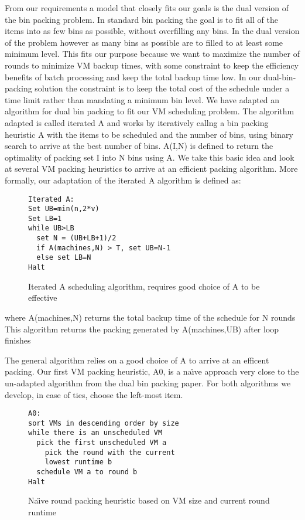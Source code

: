 From our requirements a model that closely fits our goals is the dual version
of the
bin packing problem. In standard bin packing the goal is to fit all of the
items into as few bins as possible, without overfilling any bins. In the dual
version of the problem however as many bins as possible are to filled to at
least some minimum level. This fits our purpose because we want to maximize the
number of rounds to minimize VM backup times, with some constraint to keep the
efficiency benefits of batch processing and keep the total backup time low.
In our dual-bin-packing solution the constraint is to keep the total
cost of the schedule under a time limit rather than mandating a minimum bin
level. We have adapted
an algorithm for dual bin packing\cite{DualBinPacking} to fit our VM
scheduling problem. The algorithm adapted is called iterated A and works by
iteratively callng a bin packing heuristic A with the items to be scheduled and
the number of bins, using binary search to arrive at the best number of
bins. A(I,N) is defined to return the optimality of packing set I into N bins
using A. We take this basic idea and look at several VM packing heuristics to
arrive at an efficient packing algorithm. More formally, our adaptation of the
iterated A algorithm is defined as:


\begin{figure}
\begin{lstlisting}[frame=single]
Iterated A:
Set UB=min(n,2*v)
Set LB=1
while UB>LB
  set N = (UB+LB+1)/2
  if A(machines,N) > T, set UB=N-1
  else set LB=N
Halt
\end{lstlisting}
\caption{Iterated A scheduling algorithm, requires good choice of A to be effective}
\end{figure}

where A(machines,N) returns the total backup time of the schedule for N rounds\\
This algorithm returns the packing generated by A(machines,UB) after loop finishes

The general algorithm relies on a good choice of A to arrive at an efficent
packing. Our first VM packing heuristic, A0, is a na\"\i{}ve approach very
close to the un-adapted algorithm from the dual bin packing paper. For both
algorithms we develop, in case of ties, choose the left-most item.

\begin{figure}
\begin{lstlisting}[frame=single]
A0:
sort VMs in descending order by size
while there is an unscheduled VM
  pick the first unscheduled VM a
    pick the round with the current
    lowest runtime b
  schedule VM a to round b
Halt
\end{lstlisting}
\caption{Na\"{\i}ve round packing heuristic based on VM size and current round runtime}
\end{figure}


